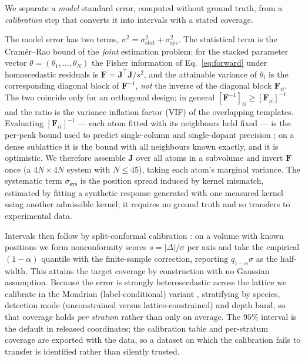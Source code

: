 \documentclass[aps,prb,twocolumn,superscriptaddress,floatfix,nofootinbib]{revtex4-2}
\begin{document}
We separate a \emph{model} standard error, computed without ground truth, from a
\emph{calibration} step that converts it into intervals with a stated coverage.

The model error has two terms, $\sigma^2=\sigma^2_{\mathrm{stat}}+\sigma^2_{\mathrm{sys}}$. The
statistical term is the Cram\'er--Rao bound of the \emph{joint} estimation problem: for the
stacked parameter vector $\theta=(\theta_1,\dots,\theta_N)$ the Fisher information of
Eq.~\eqref{eq:forward} under homoscedastic residuals is
$\mathbf{F}=\mathbf{J}^{\!\top}\mathbf{J}/s^2$, and the attainable variance of $\theta_i$ is the
corresponding diagonal block of $\mathbf{F}^{-1}$, \emph{not} the inverse of the diagonal block
$\mathbf{F}_{ii}$. The two coincide only for an orthogonal design; in general
$[\mathbf{F}^{-1}]_{ii}\ge[\mathbf{F}_{ii}]^{-1}$ and the ratio is the variance inflation factor
(VIF) of the overlapping templates. Evaluating $[\mathbf{F}_{ii}]^{-1}$ --- each atom fitted with
its neighbours held fixed --- is the per-peak bound used to predict single-column and
single-dopant precision \citep{DeBacker2016,Chen2021}; on a dense sublattice it is the bound
with all neighbours known exactly, and it is optimistic. We therefore assemble $\mathbf{J}$
over all atoms in a subvolume and invert $\mathbf{F}$ once (a $4N\times4N$ system with
$N\le45$), taking each atom's marginal variance. The systematic term $\sigma_{\mathrm{sys}}$ is
the position spread induced by kernel mismatch, estimated by fitting a synthetic response
generated with one measured kernel using another admissible kernel; it requires no ground truth
and so transfers to experimental data.

Intervals then follow by split-conformal calibration \citep{Vovk2005,AngelopoulosBates2023}: on
a volume with known positions we form nonconformity scores $s=|\Delta|/\sigma$ per axis and take
the empirical $(1-\alpha)$ quantile with the finite-sample correction, reporting
$q_{1-\alpha}\sigma$ as the half-width. This attains the target coverage by construction with no
Gaussian assumption. Because the error is strongly heteroscedastic across the lattice we
calibrate in the Mondrian (label-conditional) variant \citep{Vovk2003}, stratifying by species,
detection mode (unconstrained versus lattice-constrained) and depth band, so that coverage holds
\emph{per stratum} rather than only on average. The $95\%$ interval is the default in released
coordinates; the calibration table and per-stratum coverage are exported with the data, so a
dataset on which the calibration fails to transfer is identified rather than silently trusted.
\end{document}
